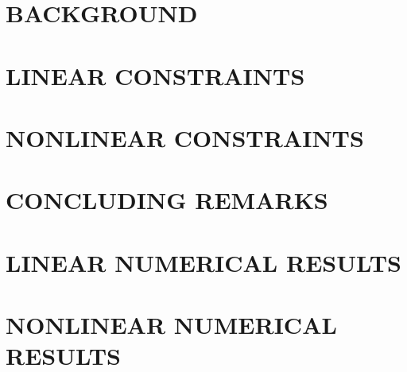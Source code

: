 \documentclass[11pt,letterpaper]{thesis2}
\begin{document}
\chapter{BACKGROUND}\label{chap:background}
 \begin{RaggedRight}

 \end{RaggedRight}
\chapter{LINEAR CONSTRAINTS}\label{chap:linear}
 \begin{RaggedRight}

 \end{RaggedRight}
\chapter{NONLINEAR CONSTRAINTS}\label{chap:general}
 \begin{RaggedRight}

 \end{RaggedRight}
\chapter{CONCLUDING REMARKS}\label{chap:conclusion}
 \begin{RaggedRight}

 \end{RaggedRight}

\begin{appendix}

\chapter{LINEAR NUMERICAL RESULTS}


\chapter{NONLINEAR NUMERICAL RESULTS}


\end{appendix}




\end{document}
